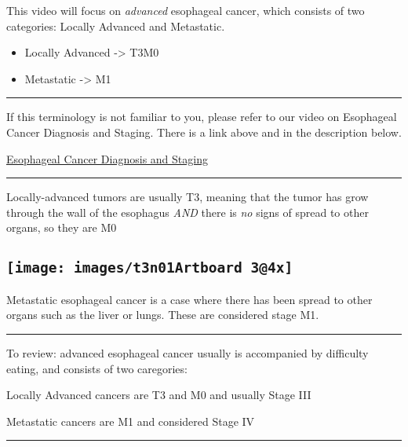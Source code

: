 \documentclass[
]{article}
\providecommand{\tightlist}{%
  \setlength{\itemsep}{0pt}\setlength{\parskip}{0pt}}
\begin{document}
This video will focus on \emph{advanced} esophageal cancer, which
consists of two categories: Locally Advanced and Metastatic.

\begin{itemize}
\tightlist
\item
  Locally Advanced -\textgreater{} T3M0
\item
  Metastatic -\textgreater{} M1
\end{itemize}

\begin{center}\rule{0.5\linewidth}{0.5pt}\end{center}

If this terminology is not familiar to you, please refer to our video on
Esophageal Cancer Diagnosis and Staging. There is a link above and in
the description below.

\href{02_Eso_Dx_Staging.html}{Esophageal Cancer Diagnosis and Staging}

\begin{center}\rule{0.5\linewidth}{0.5pt}\end{center}

Locally-advanced tumors are usually T3, meaning that the tumor has grow
through the wall of the esophagus \emph{AND} there is \emph{no} signs of
spread to other organs, so they are M0

\hypertarget{section}{%
\subsection{\texorpdfstring{\texttt{[image: images/t3n01Artboard 3@4x]}}{}}\label{section}}

Metastatic esophageal cancer is a case where there has been spread to
other organs such as the liver or lungs. These are considered stage M1.

\begin{center}\rule{0.5\linewidth}{0.5pt}\end{center}

To review: advanced esophageal cancer usually is accompanied by
difficulty eating, and consists of two caregories:

Locally Advanced cancers are T3 and M0 and usually Stage III

Metastatic cancers are M1 and considered Stage IV

\begin{center}\rule{0.5\linewidth}{0.5pt}\end{center}
\end{document}
